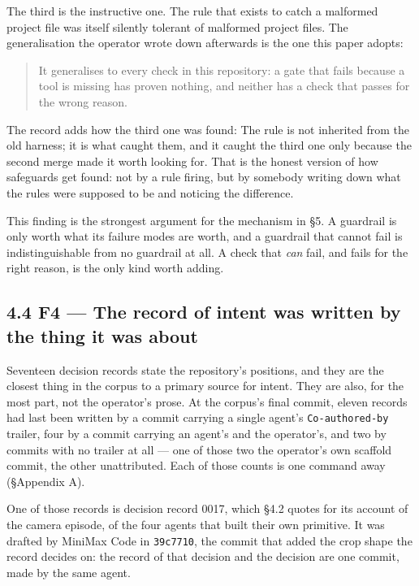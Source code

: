 \documentclass[11pt,a4paper]{article}
\begin{document}
The third is the instructive one. The rule that exists to catch a malformed project file was itself silently tolerant of malformed project files. The generalisation the operator wrote down afterwards is the one this paper adopts:

\begin{quote}
It generalises to every check in this repository: a gate that fails because a tool is missing has proven nothing, and neither has a check that passes for the wrong reason.
\end{quote}

The record adds how the third one was found: \textquotedbl{}The rule is not inherited from the old harness; it is what caught them, and it caught the third one only because the second merge made it worth looking for.\textquotedbl{} That is the honest version of how safeguards get found: not by a rule firing, but by somebody writing down what the rules were supposed to be and noticing the difference.

This finding is the strongest argument for the mechanism in \S{}5. A guardrail is only worth what its failure modes are worth, and a guardrail that cannot fail is indistinguishable from no guardrail at all. A check that \emph{can} fail, and fails for the right reason, is the only kind worth adding.

\subsection*{4.4 F4 --- The record of intent was written by the thing it was about}

Seventeen decision records state the repository's positions, and they are the closest thing in the corpus to a primary source for intent. They are also, for the most part, not the operator's prose. At the corpus's final commit, eleven records had last been written by a commit carrying a single agent's \texttt{Co-authored-by} trailer, four by a commit carrying an agent's and the operator's, and two by commits with no trailer at all --- one of those two the operator's own scaffold commit, the other unattributed. Each of those counts is one command away (\S{}Appendix A).

One of those records is decision record 0017, which \S{}4.2 quotes for its account of the camera episode, of the four agents that built their own primitive. It was drafted by MiniMax Code in \texttt{39c7710}, the commit that added the crop shape the record decides on: the record of that decision and the decision are one commit, made by the same agent.
\end{document}
